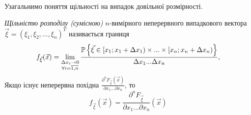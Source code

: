 Узагальнимо поняття щільності на випадок довільної розмірності.
\begin{samepage}
    \begin{definition}
        \emph{Щільністю розподілу (сумісною)} $n$-вимірного неперервного випадкового 
        вектора $\vec{\xi} = \left(\xi_1, \xi_2, ..., \xi_n\right)^T$ називається границя
        \begin{equation}
            f_{\vec{\xi}} (\vec{x}) = \lim_{\substack{\Delta x_i \to 0 \\
            \forall i = \overline{1,n}}} 
            \frac{\P\left\{\vec{\xi} \in 
            \left[x_1; x_1+\Delta x_1\right) \times ... \times 
            \left[x_n; x_n+\Delta x_n\right)\right\}}{\Delta x_1...\Delta x_n},
        \end{equation}
        Якщо існує неперервна похідна $\frac{\partial^n F_{\vec{\xi}}(\vec{x})}
        {\partial x_1 ... \partial x_n}$, то
        \begin{equation}\label{eq:dens_rn}
            f_{\vec{\xi}} (\vec{x}) = \frac{\partial^n F_{\vec{\xi}}}
            {\partial x_1 ... \partial x_n}(\vec{x})
        \end{equation}
    \end{definition}
\end{samepage}

